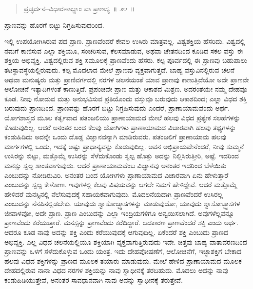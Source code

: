 \vspace{-0.3cm}

\begin{verse}
ಪ್ರಚ್ಛರ್ದನ–ವಿಧಾರಣಾಭ್ಯಾಂ ವಾ ಪ್ರಾಣಸ್ಯ~॥ ೨೪~॥
\end{verse}

\vspace{-0.4cm}

ಪ್ರಾಣವನ್ನು ಹೊರಗೆ ಬಿಟ್ಟು ನಿಗ್ರಹಿಸುವುದರಿಂದ. 

ಇಲ್ಲಿ ಉಪಯೋಗಿಸಿರುವ ಪದ ಪ್ರಾಣ. ಪ್ರಾಣವೆಂದರೆ ಕೇವಲ ಉಸಿರು ಮಾತ್ರವಲ್ಲ. ವಿಶ್ವಶಕ್ತಿಯ ಹೆಸರಿದು. ವಿಶ್ವದಲ್ಲಿ ನಮಗೆ ಕಾಣಿಸುವ ಎಲ್ಲಾ ಶಕ್ತಿಯೂ, ಸಂಚರಿಸುವ, ಕೆಲಸಮಾಡುವ, ಅಥವಾ ಚೇತನದಿಂದ ಕೂಡಿದ ಸಕಲ ವಸ್ತು ಈ ಶಕ್ತಿಯ ಅಭಿವ್ಯಕ್ತಿ. ವಿಶ್ವದಲ್ಲಿರುವ ಶಕ್ತಿ ಸಮೂಲಕ್ಕೆ ಪ್ರಾಣವೆಂದು ಹೆಸರು. ಕಲ್ಪ ಪೂರ್ವದಲ್ಲಿ ಈ ಪ್ರಾಣವು ಬಹುಪಾಲು ತಟಸ್ಥಾವಸ್ಥೆಯಲ್ಲಿರುವುದು. ಕಲ್ಪ ಮೊದಲಾದ ಮೇಲೆ ಪ್ರಾಣವು ವ್ಯಕ್ತವಾಗುತ್ತದೆ. ಬಾಹ್ಯ ವಸ್ತುವಿನಲ್ಲಿರುವ ಚಲನೆ ಅಥವಾ ಮನುಷ್ಯರು ಮತ್ತು ಪ್ರಾಣಿವರ್ಗದಲ್ಲಿ ನರಗಳ ಚಲನೆಯಂತೆ ಯಾವ ಪ್ರಾಣವು ಕಾಣುತ್ತಿದೆಯೋ ಅದೇ ಪ್ರಾಣವೇ ಆಲೋಚನೆ ಇತ್ಯಾದಿಗಳಂತೆ ಕಾಣುತ್ತಿದೆ. ಪ್ರಪಂಚವೇ ಪ್ರಾಣ ಮತ್ತು ಆಕಾಶದ ಮಿಶ್ರಣ. ಅದರಂತೆಯೇ ನಮ್ಮ ದೇಹವೂ ಕೂಡ. ನೀವು ನೋಡುವ ಮತ್ತು ಅನುಭವಿಸುವ ಪ್ರತಿಯೊಂದು ವಸ್ತುವೂ ಬರುವುದು ಆಕಾಶದಿಂದ; ಎಲ್ಲಾ ವಿಧದ ಶಕ್ತಿ ಬರುವುದು ಪ್ರಾಣದಿಂದ. ಪ್ರಾಣವನ್ನು ಹೊರಗೆ ಬಿಟ್ಟು ನಿಗ್ರಹಿಸುವುದು ಎಂದರೆ, ಪ್ರಾಣಾಯಾಮವೆಂದು ಅರ್ಥ. ಯೋಗಶಾಸ್ತ್ರದ ಮೂಲ ಕರ್ತೃವಾದ ಪತಂಜಲಿಯು ಪ್ರಾಣಾಯಾಮದ ಮೇಲೆ ಹಲವು ವಿಧದ ಪ್ರತ್ಯೇಕ ಸಲಹೆಗಳನ್ನು ಕೊಡುವುದಿಲ್ಲ. ಆದರೆ ಅನಂತರ ಬಂದ ಕೆಲವು ಯೋಗಿಗಳು ಪ್ರಾಣಾಯಾಮದ ವಿಚಾರವಾಗಿ ಹಲವು ತಥ್ಯಗಳನ್ನು ಕಂಡುಹಿಡಿದು ಅದನ್ನೇ ಒಂದು ದೊಡ್ಡ ವಿಜ್ಞಾನವನ್ನಾಗಿ ಮಾಡಿರುವರು. ಪತಂಜಲಿಗೆ ಪ್ರಾಣಾಯಾಮ ಹಲವು ಮಾರ್ಗಗಳಲ್ಲಿ ಒಂದು, ಇದಕ್ಕೆ ಅಷ್ಟು ಪ್ರಾಧಾನ್ಯವನ್ನು ಕೊಡುವುದಿಲ್ಲ. ಅವನ ಅಭಿಪ್ರಾಯವೇನೆಂದರೆ, ನೀವು ಸುಮ್ಮನೆ ಉಸಿರನ್ನು ಬಿಟ್ಟು, ಮತ್ತೊಮ್ಮೆ ಉಸಿರನ್ನು ಸೆಳೆದುಕೊಂಡು ಸ್ವಲ್ಪ ಹೊತ್ತು ಅದನ್ನು ನಿಲ್ಲಿಸಿರುತ್ತೀರಿ, ಅಷ್ಟೆ. ಇದರಿಂದ ಮನಸ್ಸು ಸ್ವಲ್ಪ ಶಾಂತವಾಗುವುದು. ಆದರೆ ಪ್ರಾಣಾಯಾಮವೆಂಬ ವಿಜ್ಞಾನವು ಅನಂತರ ಇದರಿಂದ ಬೆಳೆಯಿತು ಎಂಬುದನ್ನು ನೋಡಿರುವಿರಿ. ಅನಂತರ ಬಂದ ಯೋಗಿಗಳು ಪ್ರಾಣಾಯಾಮದ ವಿಚಾರವಾಗಿ ಏನು ಹೇಳುತ್ತಾರೆ ಎಂಬುದನ್ನು ಸ್ವಲ್ಪ ಕೇಳೋಣ. ಇವುಗಳಲ್ಲಿ ಕೆಲವು ವಿಷಯವನ್ನು ಆಗಲೇ ನಿಮಗೆ ಹೇಳಿದ್ದೇವೆ. ಆದರೆ ಮತ್ತೊಮ್ಮೆ ಹೇಳಿದರೆ ಮನಸ್ಸಿನಲ್ಲಿ ನೆಲೆಸುವುದಕ್ಕೆ ಸಹಾಯಕವಾಗುವುದು. ಮೊದಲನೆಯದಾಗಿ ಪ್ರಾಣವೆಂದರೆ ಉಸಿರಲ್ಲ ಎಂಬುದನ್ನು ನೆನಪಿನಲ್ಲಿಡಬೇಕು. ಯಾವುದು ಶ್ವಾಸೋಚ್ಛ್ವಾಸಗಳನ್ನು ಮಾಡುವುದೋ, ಯಾವುದು ಶ್ವಾಸೋಚ್ಛ್ವಾಸಗಳ ಜೀವಾಳವೋ, ಅದೇ ಪ್ರಾಣ. ಪ್ರಾಣ ಎಂಬುದನ್ನು ಎಲ್ಲಾ ಇಂದ್ರಿಯಗಳಿಗೂ ಅನ್ವಯಿಸಲಾಗಿದೆ. ಅವುಗಳೆಲ್ಲವನ್ನೂ ಪ್ರಾಣವೆಂದು ಕರೆಯುತ್ತಾರೆ. ಮನಸ್ಸನ್ನು ಪ್ರಾಣವೆಂದು ಕರೆದಿದ್ದಾರೆ. ಆದಕಾರಣ ಪ್ರಾಣವೆಂದರೆ ಶಕ್ತಿ ಎಂದು ಅರ್ಥ. ಆದರೂ ಕೂಡ ನಾವು ಅದನ್ನು ಶಕ್ತಿ ಎಂದು ಕರೆಯುವುದಕ್ಕೆ ಆಗುವುದಿಲ್ಲ. ಏಕೆಂದರೆ ಶಕ್ತಿ ಎಂಬುದು ಪ್ರಾಣದ ಅಭಿವ್ಯಕ್ತಿ. ಎಲ್ಲ ವಿಧದ ಚಲನೆಯಲ್ಲಿಯೂ ಶಕ್ತಿಯಾಗಿ ವ್ಯಕ್ತವಾಗುತ್ತಿರುವುದು ಇದೇ. ಚಿತ್ತವು ಬಾಹ್ಯ ವಾತಾವರಣದಿಂದ ಪ್ರಾಣವನ್ನು ಒಳಗೆ ಸೆಳೆದುಕೊಳ್ಳುವ ಒಂದು ಯಂತ್ರ. ಇದು ದೇಹಪೋಷಣೆಗೆ, ಆಲೋಚನೆಗೆ, ಇಚ್ಛಾಶಕ್ತಿಗೆ ಬೇಕಾದ ಹಲವು ವಿಧದ ಶಕ್ತಿಗಳನ್ನು ಪ್ರಾಣದ ಮೂಲಕ ತಯಾರು ಮಾಡುವುದು. ಮೇಲೆ ಹೇಳಿದ ಪ್ರಾಣಾಯಾಮದ ಮೂಲಕ ದೇಹದಲ್ಲಿರುವ ನಾನಾ ವಿಧದ ನರಗಳ ಶಕ್ತಿಯನ್ನು ನಾವು ಸ್ವಾಧೀನಕ್ಕೆ ತರಬಹುದು. ಮೊದಲು ಅದನ್ನು ನಾವು ಕಂಡುಹಿಡಿಯುತ್ತೇವೆ, ಅನಂತರ ಸಾವಧಾನವಾಗಿ ನಾವು ಅವನ್ನು ಸ್ವಾಧೀನಕ್ಕೆ ತರುತ್ತೇವೆ. 

